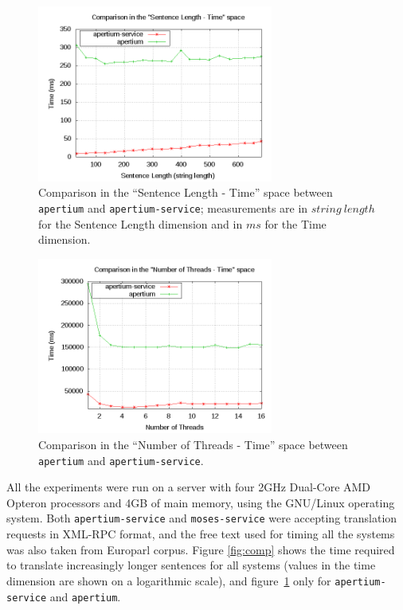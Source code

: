 \documentclass[11pt]{article}
\begin{document}
\begin{figure}[!ht]
\begin{center}
\includegraphics[width=7.75cm]{compap}
\end{center}
\caption{Comparison in the ``Sentence Length - Time'' space between {\tt\small apertium} and {\tt\small apertium-service}; measurements are in $string\ length$ for the Sentence Length dimension and in $ms$ for the Time dimension.}
\label{fig:compap}
\end{figure}

\begin{figure}[!ht]
\begin{center}
\includegraphics[width=7.75cm]{compmt}
\end{center}
\caption{Comparison in the ``Number of Threads - Time'' space between {\tt\small apertium} and {\tt\small apertium-service}.}
\label{fig:compmt}
\end{figure}

All the experiments were run on a server with four 2GHz Dual-Core AMD Opteron processors and 4GB of main memory, using the GNU/Linux operating system. Both {\tt\small apertium-service} and {\tt\small moses-service} were accepting translation requests in XML-RPC format, and the free text used for timing all the systems was also taken from Europarl corpus. Figure \ref{fig:comp} shows the time required to translate increasingly longer sentences for all systems (values in the time dimension are shown on a logarithmic scale), and figure~\ref{fig:compap} only for {\tt\small apertium-service} and {\tt\small apertium}.
\end{document}
